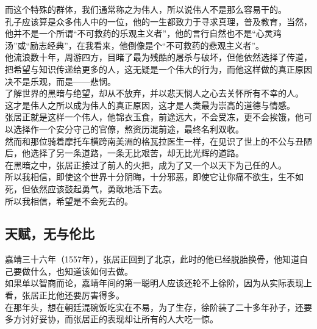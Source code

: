 \begin{multicols}{\theparacolNo}
而这个特殊的群体，我们通常称之为伟人，所以说伟人不是那么容易干的。\\

孔子应该算是众多伟人中的一位，他的一生都致力于寻求真理，普及教育，当然，他并不是一个所谓“不可救药的乐观主义者”，他的言行自然也不是“心灵鸡汤”或“励志经典”，在我看来，他倒像是个“不可救药的悲观主义者”。\\

他流浪数十年，周游四方，目睹了最为残酷的屠杀与破坏，但他依然选择了传道，把希望与知识传递给更多的人，这无疑是一个伟大的行为，而他这样做的真正原因决不是乐观，而是——悲悯。\\

了解世界的黑暗与绝望，却从不放弃，并以悲天悯人之心去关怀所有不幸的人。\\

这才是伟人之所以成为伟人的真正原因，这才是人类最为崇高的道德与情感。\\

张居正就是这样一个伟人，他锦衣玉食，前途远大，不会受冻，更不会挨饿，他可以选择作一个安分守己的官僚，熬资历混前途，最终名利双收。\\

然而和那位骑着摩托车横跨南美洲的格瓦拉医生一样，在见识了世上的不公与丑陋后，他选择了另一条道路，一条无比艰苦，却无比光辉的道路。\\

在黑暗之中，张居正接过了前人的火把，成为了又一个以天下为己任的人。\\

所以我相信，即使这个世界十分阴晦，十分邪恶，即使它让你痛不欲生，生不如死，但依然应该鼓起勇气，勇敢地活下去。\\

所以我相信，希望是不会死去的。\\

\subsection{天赋，无与伦比}
嘉靖三十六年（1557年），张居正回到了北京，此时的他已经脱胎换骨，他知道自己要做什么，也知道该如何去做。\\

如果单以智商而论，嘉靖年间的第一聪明人应该还轮不上徐阶，因为从实际表现上看，张居正比他还要厉害得多。\\

在那年头，想在朝廷混碗饭吃实在不易，为了生存，徐阶装了二十多年孙子，还要多方讨好妥协，而张居正的表现却让所有的人大吃一惊。\\


\end{multicols}
